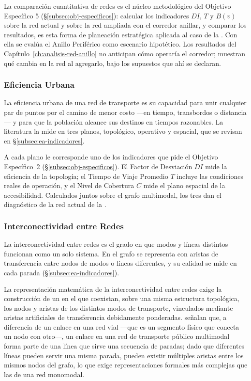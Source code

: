 La comparación cuantitativa de redes es el núcleo metodológico del Objetivo
Específico 5 (§\ref{subsec:obj-especificos}): calcular los indicadores $DI$, $T$
y $B(v)$ sobre la red actual y sobre la red ampliada con el corredor anillar, y
comparar los resultados, es esta forma de planeación estratégica aplicada al
caso de la \zmvm{}. Con ella se evalúa el Anillo Periférico como escenario
hipotético. Los resultados del Capítulo~\ref{ch:analisis-red-anillo} no
anticipan cómo operaría el corredor; muestran qué cambia en la red al agregarlo,
bajo los supuestos que ahí se declaran.

\subsubsection*{Eficiencia Urbana}
\label{subsec:eficiencia-urbana}

La eficiencia urbana de una red de transporte es su capacidad para unir
cualquier par de puntos por el camino de menor costo ---en tiempo, transbordos
o distancia--- y para que la población alcance sus destinos en tiempos
razonables. La literatura la mide en tres planos, topológico, operativo y
espacial, que se revisan en §\ref{subsec:ea-indicadores}.

A cada plano le corresponde uno de los indicadores que pide el Objetivo
Específico~2 (§\ref{subsec:obj-especificos}). El Factor de Desviación $DI$ mide
la eficiencia de la topología; el Tiempo de Viaje Promedio $T$ incluye las
condiciones reales de operación, y el Nivel de Cobertura $C$ mide el plano
espacial de la accesibilidad. Calculados juntos sobre el grafo multimodal, los
tres dan el diagnóstico de la red actual de la \zmvm{}.

\subsubsection*{Interconectividad entre Redes}
\label{subsec:interconectividad}

La interconectividad entre redes es el grado en que modos y líneas distintos
funcionan como un solo sistema. En el grafo se representa con aristas de
transferencia entre nodos de modos o líneas diferentes, y su calidad se mide en
cada parada (§\ref{subsec:ea-indicadores}).

\label{subsubsec:grafo-multimodal}
La representación matemática de la interconectividad entre redes exige la
construcción de un  en el que coexistan, sobre una
misma estructura topológica, los nodos y aristas de los distintos modos de
transporte, vinculados mediante aristas artificiales de transferencia
debidamente ponderadas. \citet{mishra2015} señalan que, a diferencia de un
enlace en una red vial ---que es un segmento físico que conecta un nodo con
otro---, un enlace en una red de transporte público multimodal forma parte de
una línea que sirve una secuencia de paradas; dado que diferentes líneas pueden
servir una misma parada, pueden existir múltiples aristas entre los mismos nodos
del grafo, lo que exige representaciones formales más complejas que las de una
red monomodal.

